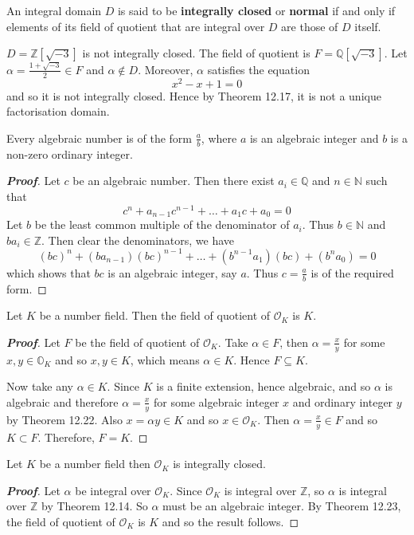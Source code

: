 \begin{definition} An integral domain $D$ is said to be {\bf integrally closed} or {\bf normal} if and only if elements of its field of quotient that are integral over $D$ are those of $D$ itself.
\end{definition}
\begin{example} $D=\mathbb{Z}[\sqrt{-3}]$ is not integrally closed. The field of quotient is $F=\mathbb{Q}[\sqrt{-3}]$. Let $\alpha=\frac{1+\sqrt{-3}}{2} \in F$ and $\alpha \not \in D$. Moreover, $\alpha$ satisfies the equation
$$x^2-x+1=0$$
and so it is not integrally closed. Hence by Theorem 12.17, it is not a unique factorisation domain.
\end{example}
\begin{theorem} Every algebraic number is of the form $\frac{a}{b}$, where $a$ is an algebraic integer and $b$ is a non-zero ordinary integer.
\end{theorem}
\begin{proof}[\bf Proof] Let $c$ be an algebraic number. Then there exist $a_i \in \mathbb{Q}$ and $n \in \mathbb{N}$ such that
$$c^n+a_{n-1}c^{n-1}+\ldots+a_1 c+a_0=0$$
Let $b$ be the least common multiple of the denominator of $a_i$. Thus $b \in \mathbb{N}$ and $ba_i \in \mathbb{Z}$. Then clear the denominators, we have
$$(bc)^n+(ba_{n-1})(bc)^{n-1}+\ldots+(b^{n-1}a_1)(bc)+(b^na_0)=0$$
which shows that $bc$ is an algebraic integer, say $a$. Thus $c=\frac{a}{b}$ is of the required form.
\end{proof}
\begin{theorem} Let $K$ be a number field. Then the field of quotient of $\mathcal{O}_K$ is $K$.
\end{theorem}
\begin{proof}[\bf Proof] Let $F$ be the field of quotient of $\mathcal{O}_K$. Take $\alpha \in F$, then $\alpha=\frac{x}{y}$ for some $x,y \in \mathbb{O}_K$ and so $x,y \in K$, which means $\alpha \in K$. Hence $F \subseteq K$.

Now take any $\alpha \in K$. Since $K$ is a finite extension, hence algebraic, and so $\alpha$ is algebraic and therefore $\alpha=\frac{x}{y}$ for some algebraic integer $x$ and ordinary integer $y$ by Theorem 12.22. Also
$x =\alpha y \in K$ and so $x \in \mathcal{O}_K$. Then $\alpha=\frac{x}{y} \in F$ and so $K \subset F$. Therefore, $F=K$.
\end{proof}
\begin{theorem} Let $K$ be a number field then $\mathcal{O}_K$ is integrally closed.
\end{theorem}
\begin{proof}[\bf Proof] Let $\alpha$ be integral over $\mathcal{O}_K$. Since $\mathcal{O}_K$ is integral over $\mathbb{Z}$, so $\alpha$ is integral over $\mathbb{Z}$ by Theorem 12.14. So $\alpha$ must be an algebraic integer. By Theorem 12.23, the field of quotient of $\mathcal{O}_K$ is $K$ and so the result follows.
\end{proof}
